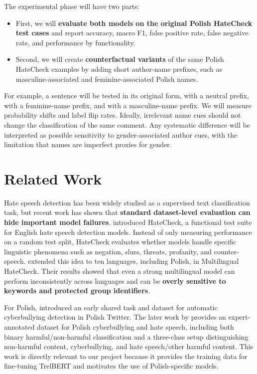 \documentclass[11pt,a4paper]{article}
\begin{document}
The experimental phase will have two parts:

\begin{itemize}
    \item First, we will \textbf{evaluate both models on the original Polish HateCheck test cases} and report accuracy, macro F1, false positive rate, false negative rate, and performance by functionality.
    \item Second, we will create \textbf{counterfactual variants} of the same Polish HateCheck examples by adding short author-name prefixes, such as masculine-associated and feminine-associated Polish names.
\end{itemize}

For example, a sentence will be tested in its original form, with a neutral prefix, with a feminine-name prefix, and with a masculine-name prefix. We will measure probability shifts and label flip rates. Ideally, irrelevant name cues should not change the classification of the same comment. Any systematic difference will be interpreted as possible sensitivity to gender-associated author cues, with the limitation that names are imperfect proxies for gender.

\section{Related Work}

Hate speech detection has been widely studied as a supervised text classification task, but recent work has shown that \textbf{standard dataset-level evaluation can hide important model failures}. \citet{Rottger2021} introduced HateCheck, a functional test suite for English hate speech detection models. Instead of only measuring performance on a random test split, HateCheck evaluates whether models handle specific linguistic phenomena such as negation, slurs, threats, profanity, and counter-speech. \citet{Rottger2022} extended this idea to ten languages, including Polish, in Multilingual HateCheck. Their results showed that even a strong multilingual model can perform inconsistently across languages and can be \textbf{overly sensitive to keywords and protected group identifiers}.

For Polish, \citet{Ptaszynski2019} introduced an early shared task and dataset for automatic cyberbullying detection in Polish Twitter. The later work by \citet{Ptaszynski2024} provides an expert-annotated dataset for Polish cyberbullying and hate speech, including both binary harmful/non-harmful classification and a three-class setup distinguishing non-harmful content, cyberbullying, and hate speech/other harmful content. This work is directly relevant to our project because it provides the training data for fine-tuning TrelBERT and motivates the use of Polish-specific models.
\end{document}
